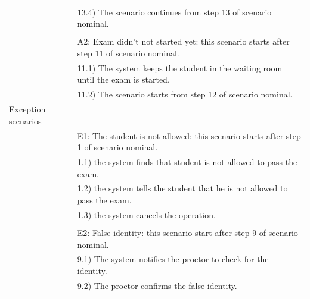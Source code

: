 \documentclass[]{uc2pfecaneva}
\begin{document}
\begin{table}[h]
\begin{tabularx}{\textwidth}{|l|X|}
		                      & \hspace{4mm}13.4) The scenario continues from step 13 of scenario nominal.                        \\
		                      &                                                                                                   \\
		                      & A2: Exam didn't not started yet: this scenario starts after step 11 of scenario nominal.          \\
		                      & \hspace{4mm}11.1) The system keeps the student in the waiting room until the exam is started.     \\
		                      & \hspace{4mm}11.2) The scenario starts from step 12 of scenario nominal.                           \\ \hline
		Exception scenarios   &                                                                                                   \\
		                      & E1: The student is not allowed: this scenario starts after step 1 of scenario nominal.            \\
		                      & \hspace{4mm}1.1) the system finds that student is not allowed to pass the exam.                   \\
		                      & \hspace{4mm}1.2) the system tells the student that he is not allowed to pass the exam.            \\
		                      & \hspace{4mm}1.3) the system cancels the operation.                                                \\
		                      &                                                                                                   \\
		                      & E2: False identity: this scenario start after step 9 of scenario nominal.                         \\
		                      & \hspace{4mm}9.1) The system notifies the proctor to check for the identity.                       \\
		                      & \hspace{4mm}9.2) The proctor confirms the false identity.                                         \\

\end{tabularx}
\end{table}
\end{document}
